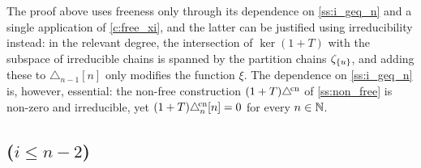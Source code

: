 \begin{remark*}\label{r:freeness_usage}
	The proof above uses freeness only through its dependence on \cref{ss:i_geq_n} and a single application of \cref{c:free_xi}, and the latter can be justified using irreducibility instead:
	in the relevant degree, the intersection of $\ker(1+T)$ with the subspace of irreducible chains is spanned by the partition chains $\zeta_{\{u\}}$, and adding these to $\triangle_{n-1}[n]$ only modifies the function $\xi$.
	The dependence on \cref{ss:i_geq_n} is, however, essential: the non-free construction $(1+T)\triangle^{\!\mathrm{cn}}$ of \cref{ss:non_free} is non-zero and irreducible, yet $(1+T)\triangle^{\!\mathrm{cn}}_n[n] = 0$ for every $n \in \mathbb{N}$.
\end{remark*}

\subsection{($i \leq n-2$)}\label{ss:proof}

